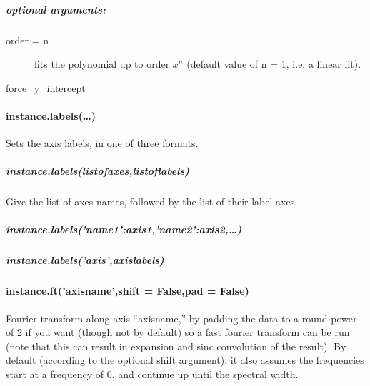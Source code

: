 \subparagraph{optional arguments:}
\begin{mykwargs}
    \begin{description}
        \item[order = n] fits the polynomial up to order $x^n$
            (default value of n = 1, i.e. a linear fit).
        \item[force\_y\_intercept] 
    \end{description}
\end{mykwargs}



\paragraph{instance.labels(\ldots)}
Sets the axis labels, in one of three formats.
\subparagraph{instance.labels(listofaxes,listoflabels)}
Give the list of axes names, followed by the list of their label axes.
\subparagraph{instance.labels({'name1':axis1,'name2':axis2,\ldots})}
\nts{label the axes in dictionary format}
\subparagraph{instance.labels('axis',axislabels)}
\paragraph{instance.ft('axisname',shift = False,pad = False)}
Fourier transform along axis ``axisname,'' by padding the data to a round power of 2 if you want (though not by default) so a fast fourier transform can be run (note that this can result in expansion and sinc convolution of the result).
By default (according to the optional shift argument),
    it also assumes the frequencies start at a frequency of 0,
    and continue up until the spectral width.

